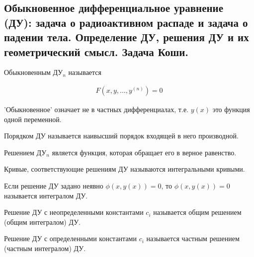 \subsection{%
  Обыкновенное дифференциальное уравнение (ДУ): задача о радиоактивном распаде
  и задача о падении тела. Определение ДУ, решения ДУ и их геометрический
  смысл. Задача Коши.%
}

\begin{definition}
  Обыкновенным ДУ\(_{n}\) называется

  \begin{align*}
    F(x, y, \dotsc, y^{(n)}) = 0
  \end{align*}
\end{definition}

\begin{remark}
  'Обыкновенное' означает не в частных дифференциалах, т.е. \(y(x)\) это
  функция одной переменной.
\end{remark}

\begin{definition}
  Порядком ДУ называется наивысший порядок входящей в него производной.
\end{definition}

\begin{definition}
  Решением ДУ\(_{n}\) является функция, которая обращает его в верное равенство.
\end{definition}

\begin{definition}
  Кривые, соответствующие решениям ДУ называются интегральными кривыми.
\end{definition}

\begin{definition}
  Если решение ДУ задано неявно \(\phi(x, y(x)) = 0\), то 
  \(\phi(x, y(x)) = 0\) называется интегралом ДУ.
\end{definition}

\begin{definition}
  Решение ДУ с неопределенными константами \(c_{i}\) называется общим решением
  (общим интегралом) ДУ.  
\end{definition}

\begin{definition}
  Решение ДУ с определенными константами \(c_{i}\) называется частным решением
  (частным интегралом) ДУ.
\end{definition} 

